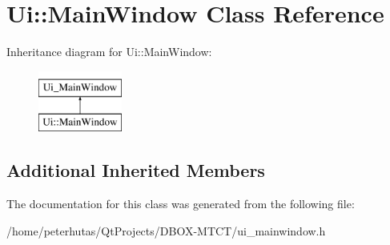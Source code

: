 \hypertarget{class_ui_1_1_main_window}{}\section{Ui\+:\+:Main\+Window Class Reference}
\label{class_ui_1_1_main_window}
Inheritance diagram for Ui\+:\+:Main\+Window\+:\begin{figure}[H]
\begin{center}
\leavevmode
\includegraphics[height=2.000000cm]{class_ui_1_1_main_window}
\end{center}
\end{figure}
\subsection*{Additional Inherited Members}


The documentation for this class was generated from the following file\+:\begin{DoxyCompactItemize}
\item 
/home/peterhutas/\+Qt\+Projects/\+D\+B\+O\+X-\/\+M\+T\+C\+T/ui\+\_\+mainwindow.\+h\end{DoxyCompactItemize}
